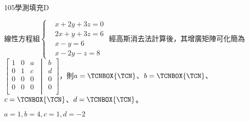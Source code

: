     \begin{QUESTION}
        \begin{ExamInfo}{105}{學測}{填充}{D}
        \end{ExamInfo}
        \begin{ExamAnsRateInfo}{51}{86}{56}{11}
        \end{ExamAnsRateInfo}
        \begin{QBODY}
            線性方程組$\left\{ \begin{aligned}
			 & x+2y+3z=0 \\ 
			 & 2x+y+3z=6 \\ 
			 & x-y=6 \\ 
			 & x-2y-z=8  
			\end{aligned} \right.$ 經高斯消去法計算後，其增廣矩陣可化簡為$\left[ \left. \begin{matrix}
			   1 & 0 & a  \\
			   0 & 1 & c  \\
			   0 & 0 & 0  \\
			   0 & 0 & 0  \\
			\end{matrix}\ \  \right|\ \ \begin{matrix}
			   b  \\
			   d  \\
			   0  \\
			   0  \\
			\end{matrix} \right]$，則$a=\TCNBOX{\TCN}$、$b=\TCNBOX{\TCN}$、$c=\TCNBOX{\TCN}$、$d=\TCNBOX{\TCN}$。
        \end{QBODY}
        \begin{QFROMS}
        \end{QFROMS}
        \begin{QTAGS}\end{QTAGS}
        \begin{QANS}
            $a=1, b=4, c= 1, d=-2$
        \end{QANS}
        \begin{QSOLLIST}
        \end{QSOLLIST}
        \begin{QEMPTYSPACE}
        \end{QEMPTYSPACE}
    \end{QUESTION}
